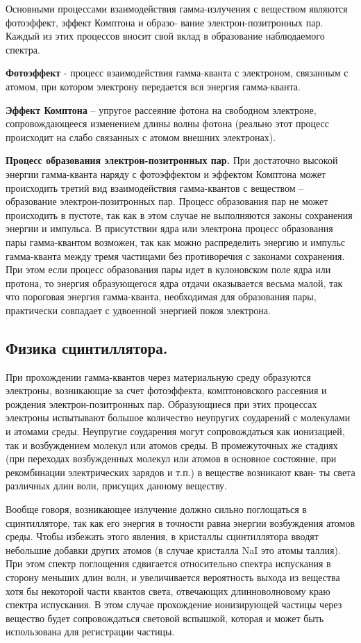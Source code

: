 \documentclass[%
 reprint,
 amsmath,amssymb,
 aps,
]{revtex4-2}
\begin{document}
Основными процессами взаимодействия гамма-излучения с веществом
являются фотоэффект, эффект Комптона и образо-
вание электрон-позитронных пар. Каждый из этих процессов вносит свой
вклад в образование наблюдаемого спектра.

\textbf{Фотоэффект} - процесс взаимодействия гамма-кванта с электроном, связанным с атомом, 
при котором электрону передается вся энергия гамма-кванта.

\textbf{Эффект Комптона} – упругое рассеяние фотона на свободном электроне,
сопровождающееся изменением длины волны фотона (реально этот процесс
происходит на слабо связанных с атомом внешних электронах). 

\textbf{Процесс образования электрон-позитронных пар.} При достаточно высокой энергии гамма-кванта наряду с фотоэффектом и эффектом Комптона
может происходить третий вид взаимодействия гамма-квантов с веществом –
образование электрон-позитронных пар. Процесс образования пар не может
происходить в пустоте, так как в этом случае не выполняются законы сохранения энергии и импульса. В присутствии ядра или электрона процесс образования пары гамма-квантом возможен, так как можно распределить энергию
и импульс гамма-кванта между тремя частицами без противоречия с законами сохранения. При этом если процесс образования пары идет в кулоновском
поле ядра или протона, то энергия образующегося ядра отдачи оказывается
весьма малой, так что пороговая энергия гамма-кванта, необходимая для
образования пары, практически совпадает с удвоенной энергией покоя электрона.

\subsection{Физика сцинтиллятора.}

При прохождении гамма-квантов через материальную среду образуются
электроны, возникающие за счет фотоэффекта, комптоновского рассеяния и
рождения электрон-позитронных пар. Образующиеся при этих процессах электроны испытывают большое количество неупругих соударений с молекулами и атомами
среды. Неупругие соударения могут сопровождаться как ионизацией, так и
возбуждением молекул или атомов среды. В промежуточных же стадиях (при
переходах возбужденных молекул или атомов в основное состояние, при
рекомбинации электрических зарядов и т.п.) в веществе возникают кван-
ты света различных длин волн, присущих данному веществу.

Вообще говоря, возникающее излучение должно сильно поглощаться в
сцинтилляторе, так как его энергия в точности равна энергии возбуждения
атомов среды. Чтобы избежать этого явления, в кристаллы сцинтиллятора
вводят небольшие добавки других атомов (в случае кристалла NaI это атомы
таллия). При этом спектр поглощения сдвигается относительно спектра
испускания в сторону меньших длин волн, и увеличивается вероятность
выхода из вещества хотя бы некоторой части квантов света, отвечающих
длинноволновому краю спектра испускания. В этом случае прохождение
ионизирующей частицы через вещество будет сопровождаться световой
вспышкой, которая и может быть использована для регистрации частицы.
\end{document}
